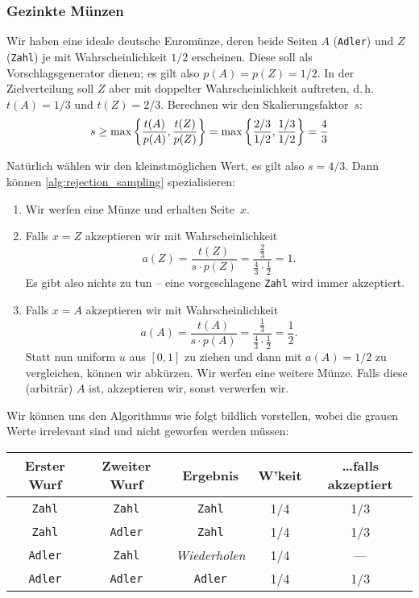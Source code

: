 \subsubsection{Gezinkte Münzen}
Wir haben eine ideale deutsche Euromünze, deren beide Seiten $A$ (\texttt{Adler}) und $Z$ (\texttt{Zahl}) je mit Wahrscheinlichkeit $1/2$ erscheinen.
Diese soll als Vorschlagsgenerator dienen; es gilt also $p(A) = p(Z) = 1/2$.
In der Zielverteilung soll $Z$ aber mit doppelter Wahrscheinlichkeit auftreten, d.\,h. $t(A) = 1/3$ und $t(Z) = 2/3$.
Berechnen wir den Skalierungsfaktor~$s$:
\begin{align}
    s \ge \max\left\{ \frac{t(A)}{p(A)}, \frac{t(Z)}{p(Z)} \right\} = \max\left\{ \frac{2/3}{1/2}, \frac{1/3}{1/2} \right\} = \frac{4}{3}
\end{align}

\noindent
Natürlich wählen wir den kleinstmöglichen Wert, es gilt also $s=4/3$. Dann können \cref{alg:rejection_sampling} spezialisieren:
\begin{enumerate}
    \item Wir werfen eine Münze und erhalten Seite~$x$.
    \item Falls $x = Z$ akzeptieren wir mit Wahrscheinlichkeit
          $$
              a(Z) = \frac{t(Z)}{s \cdot p(Z)} = \frac{\frac 2 3}{\frac 4 3 \cdot \frac 1 2} = 1.
          $$
          Es gibt also nichts zu tun -- eine vorgeschlagene \texttt{Zahl} wird immer akzeptiert.
    \item Falls $x = A$ akzeptieren wir mit Wahrscheinlichkeit
          $$
              a(A) = \frac{t(A)}{s \cdot p(A)} = \frac{\frac 1 3}{\frac 4 3 \cdot \frac 1 2} = \frac 1 2.
          $$
          Statt nun uniform $u$ aus $[0, 1]$ zu ziehen und dann mit $a(A) = 1/2$ zu vergleichen, können wir abkürzen.
          Wir werfen eine weitere Münze. Falls diese (arbiträr) $A$ ist, akzeptieren wir, sonst verwerfen wir.
\end{enumerate}

Wir können uns den Algorithmus wie folgt bildlich vorstellen, wobei die grauen Werte irrelevant sind und nicht geworfen werden müssen:
\begin{center}
    \begin{tabular}{c|c|c||c|c}
        Erster Wurf    & Zweiter Wurf                         & Ergebnis           & W'keit & \ldots falls akzeptiert \\\hline
        \texttt{Zahl}  & \textcolor{black!50}{\texttt{Zahl}}  & \texttt{Zahl}      & 1/4    & 1/3                     \\
        \texttt{Zahl}  & \textcolor{black!50}{\texttt{Adler}} & \texttt{Zahl}      & 1/4    & 1/3                     \\\hline
        \texttt{Adler} & \texttt{Zahl}                        & \emph{Wiederholen} & 1/4    & ---                     \\\hline
        \texttt{Adler} & \texttt{Adler}                       & \texttt{Adler}     & 1/4    & 1/3
    \end{tabular}
\end{center}

